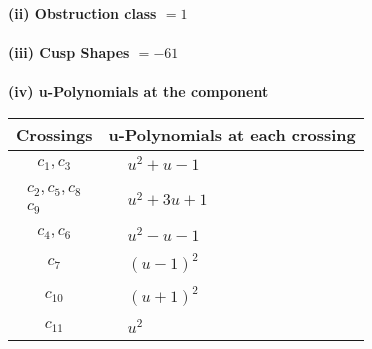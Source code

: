 \documentclass[1p]{elsarticle_modified}
\theoremstyle{definition}
\begin{document}
\flushleft \textbf{(ii) Obstruction class $= 1$}\\~\\
\flushleft \textbf{(iii) Cusp Shapes $= -61$}\\~\\
\newpage\renewcommand{\arraystretch}{1}
\flushleft \textbf{(iv) u-Polynomials at the component}\newline \\
\begin{tabular}{m{50pt}|m{274pt}}
Crossings & \hspace{64pt}u-Polynomials at each crossing \\
\hline $$\begin{aligned}c_{1},c_{3}\end{aligned}$$&$\begin{aligned}
&u^2+u-1
\end{aligned}$\\
\hline $$\begin{aligned}c_{2},c_{5},c_{8}\\c_{9}\end{aligned}$$&$\begin{aligned}
&u^2+3 u+1
\end{aligned}$\\
\hline $$\begin{aligned}c_{4},c_{6}\end{aligned}$$&$\begin{aligned}
&u^2- u-1
\end{aligned}$\\
\hline $$\begin{aligned}c_{7}\end{aligned}$$&$\begin{aligned}
&(u-1)^2
\end{aligned}$\\
\hline $$\begin{aligned}c_{10}\end{aligned}$$&$\begin{aligned}
&(u+1)^2
\end{aligned}$\\
\hline $$\begin{aligned}c_{11}\end{aligned}$$&$\begin{aligned}
&u^2
\end{aligned}$\\
\hline
\end{tabular}\\~\\
\end{document}
